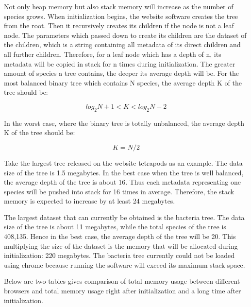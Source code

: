 \documentclass[MSc]{icldt}
\begin{document}
Not only heap memory but also stack memory will increase as the number of species grows. When initialization begins, the website software creates the tree from the root. Then it recursively creates its children if the node is not a leaf node. The parameters which passed down to create its children are the dataset of the children, which is a string containing all metadata of its direct children and all further children. Therefore, for a leaf node which has a depth of n, its metadata will be copied in stack for n times during initialization. The greater amount of species a tree contains, the deeper its average depth will be. For the most balanced binary tree which contains N species, the average depth K of the tree should be:

\begin{equation*}
log_2 N + 1 < K < log_2 N + 2
\end{equation*}

In the worst case, where the binary tree is totally unbalanced, the average depth K of the tree should be:

 \begin{equation*}
	K = N/2
\end{equation*}

Take the largest tree released on the website tetrapods as an example. The data size of the tree is 1.5 megabytes. In the best case when the tree is well balanced, the average depth of the tree is about 16. Thus each metadata representing one species will be pushed into stack for 16 times in average. Therefore, the stack memory is expected to increase by at least 24 megabytes.

 The largest dataset that can currently be obtained is the bacteria tree. The data size of the tree is about 11 megabytes, while the total species of the tree is 408,135. Hence in the best case, the average depth of the tree will be 20. This multiplying the size of the dataset is the memory that will be allocated during initialization: 220 megabytes. The bacteria tree currently could not be loaded using chrome because running the software will exceed its maximum stack space. 
 
 Below are two tables gives comparison of total memory usage between different browsers and total memory usage right after initialization and a long time after initialization.
 
\end{document}
